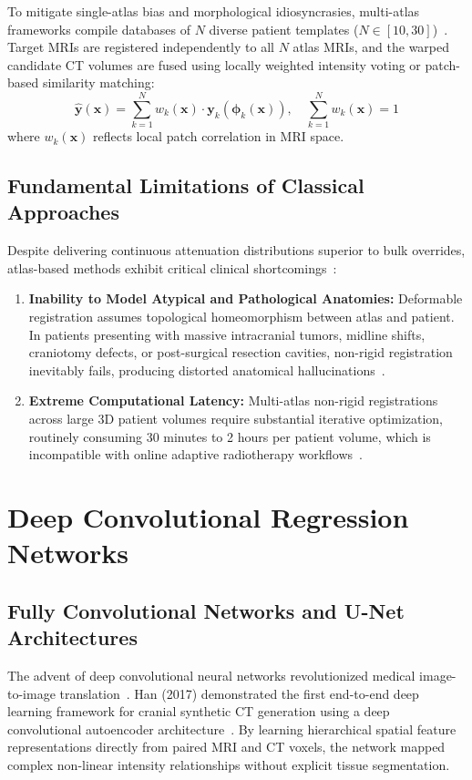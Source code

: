 To mitigate single-atlas bias and morphological idiosyncrasies, multi-atlas frameworks compile databases of $N$ diverse patient templates ($N \in [10, 30]$)~\cite{sjolund2015comprehensive,burgos2014multi}. Target MRIs are registered independently to all $N$ atlas MRIs, and the warped candidate CT volumes are fused using locally weighted intensity voting or patch-based similarity matching:
\begin{equation}
\mathbf{\hat{y}}(\mathbf{x}) = \sum_{k=1}^N w_k(\mathbf{x}) \cdot \mathbf{y}_k(\boldsymbol{\phi}_k(\mathbf{x})), \quad \sum_{k=1}^N w_k(\mathbf{x}) = 1
\label{eq:multi_atlas}
\end{equation}
where $w_k(\mathbf{x})$ reflects local patch correlation in MRI space.

\subsection{Fundamental Limitations of Classical Approaches}
Despite delivering continuous attenuation distributions superior to bulk overrides, atlas-based methods exhibit critical clinical shortcomings~\cite{edmund2017review,thummerer2023synthrad2023}:
\begin{enumerate}[label=\textbf{(\arabic*)}]
    \item \textbf{Inability to Model Atypical and Pathological Anatomies:} Deformable registration assumes topological homeomorphism between atlas and patient. In patients presenting with massive intracranial tumors, midline shifts, craniotomy defects, or post-surgical resection cavities, non-rigid registration inevitably fails, producing distorted anatomical hallucinations~\cite{edmund2017review}.
    \item \textbf{Extreme Computational Latency:} Multi-atlas non-rigid registrations across large 3D patient volumes require substantial iterative optimization, routinely consuming 30 minutes to 2 hours per patient volume, which is incompatible with online adaptive radiotherapy workflows~\cite{sjolund2015comprehensive}.
\end{enumerate}

\section{Deep Convolutional Regression Networks}

\subsection{Fully Convolutional Networks and U-Net Architectures}
The advent of deep convolutional neural networks revolutionized medical image-to-image translation~\cite{ronneberger2015u,han2017mr,nie2016fully}. Han (2017) demonstrated the first end-to-end deep learning framework for cranial synthetic CT generation using a deep convolutional autoencoder architecture~\cite{han2017mr}. By learning hierarchical spatial feature representations directly from paired MRI and CT voxels, the network mapped complex non-linear intensity relationships without explicit tissue segmentation.


